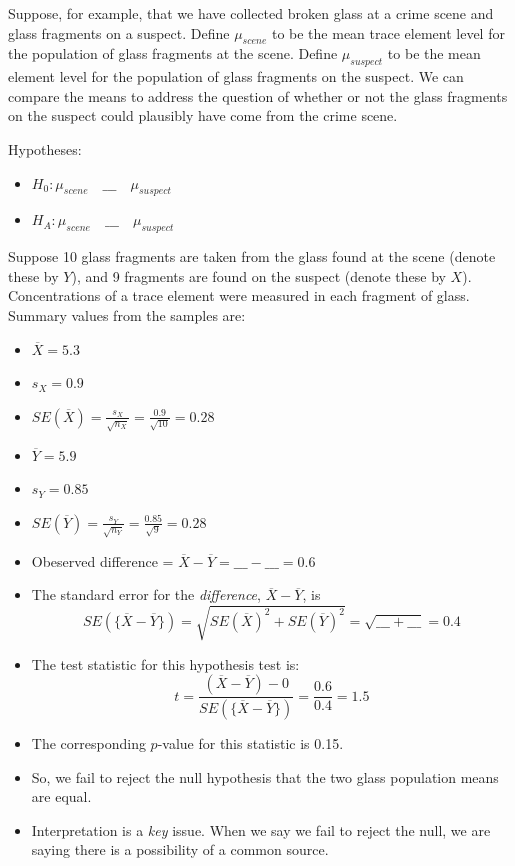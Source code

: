 \documentclass[]{book}
\providecommand{\tightlist}{%
  \setlength{\itemsep}{0pt}\setlength{\parskip}{0pt}}
\theoremstyle{definition}
\theoremstyle{definition}
\theoremstyle{remark}
\begin{document}
Suppose, for example, that we have collected broken glass at a crime
scene and glass fragments on a suspect. Define \(\mu_{scene}\) to be the
mean trace element level for the population of glass fragments at the
scene. Define \(\mu_{suspect}\) to be the mean element level for the
population of glass fragments on the suspect. We can compare the means
to address the question of whether or not the glass fragments on the
suspect could plausibly have come from the crime scene.

Hypotheses:

\begin{itemize}
\tightlist
\item
  \(H_0 : \mu_{scene} \quad \_\_\_ \quad \mu_{suspect}\) \vspace{.1in}
\item
  \(H_A : \mu_{scene} \quad \_\_\_ \quad \mu_{suspect}\)
\end{itemize}

Suppose 10 glass fragments are taken from the glass found at the scene
(denote these by \(Y\)), and 9 fragments are found on the suspect
(denote these by \(X\)). Concentrations of a trace element were measured
in each fragment of glass. Summary values from the samples are:

\begin{itemize}
\tightlist
\item
  \(\overline{X} = 5.3\) \vspace{.1in}
\item
  \(s_X = 0.9\) \vspace{.1in}
\item
  \(SE(\overline{X}) = \frac{s_X}{\sqrt{n_X}} = \frac{0.9}{\sqrt{10}} = 0.28\)
  \vspace{.1in}
\item
  \(\overline{Y} = 5.9\) \vspace{.1in}
\item
  \(s_Y = 0.85\) \vspace{.1in}
\item
  \(SE(\overline{Y}) = \frac{s_Y}{\sqrt{n_Y}} = \frac{0.85}{\sqrt{9}} = 0.28\)
  \vspace{.1in}
\item
  Obeserved difference =
  \(\overline{X} - \overline{Y} = \_\_\_ - \_\_\_ = 0.6\) \vspace{.1in}
\item
  The standard error for the \emph{difference},
  \(\overline{X} - \overline{Y}\), is
  \[SE(\{\overline{X} - \overline{Y}\}) = \sqrt{SE(\overline{X})^2 + SE(\overline{Y})^2} = \sqrt{\_\_\_ + \_\_\_} = 0.4\]
\item
  The test statistic for this hypothesis test is:
  \[t = \frac{(\overline{X} - \overline{Y}) - 0}{SE(\{\overline{X} - \overline{Y}\})} = \frac{0.6}{0.4} = 1.5\]
\item
  The corresponding \(p\)-value for this statistic is 0.15.
\item
  So, we fail to reject the null hypothesis that the two glass
  population means are equal.
\item
  Interpretation is a \emph{key} issue. When we say we fail to reject
  the null, we are saying there is a possibility of a common source.
\end{itemize}
\end{document}
